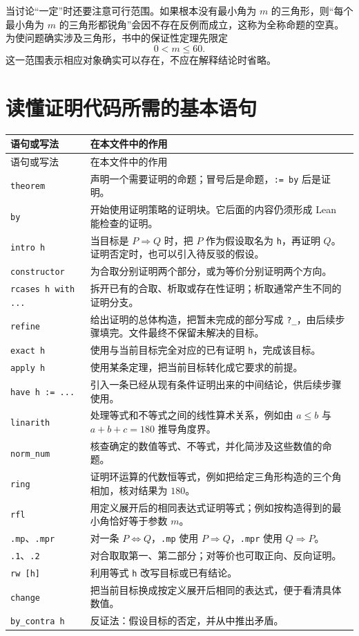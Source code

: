 \documentclass[UTF8,a4paper,zihao=-4,oneside,openany,fontset=fandol]{ctexbook}
\theoremstyle{definition}
\theoremstyle{remark}
\begin{document}
当讨论“一定”时还要注意可行范围。如果根本没有最小角为 $m$ 的三角形，则“每个最小角为 $m$ 的三角形都锐角”会因不存在反例而成立，这称为全称命题的空真。为使问题确实涉及三角形，书中的保证性定理先限定
\[
0<m\le60.
\]
这一范围表示相应对象确实可以存在，不应在解释结论时省略。

\clearpage
\section{读懂证明代码所需的基本语句}

\begin{longtable}{@{}p{}p{}@{}}
\toprule
语句或写法 & 在本文件中的作用\\
\midrule
\endfirsthead
\toprule
语句或写法 & 在本文件中的作用\\
\midrule
\endhead
\texttt{theorem} & 声明一个需要证明的命题；冒号后是命题，\texttt{:= by} 后是证明。\\
\texttt{by} & 开始使用证明策略的证明块。它后面的内容仍须形成 Lean 能检查的证明。\\
\texttt{intro h} & 当目标是 $P\Rightarrow Q$ 时，把 $P$ 作为假设取名为 \texttt{h}，再证明 $Q$。证明否定时，也可以引入待反驳的假设。\\
\texttt{constructor} & 为合取分别证明两个部分，或为等价分别证明两个方向。\\
\texttt{rcases h with ...} & 拆开已有的合取、析取或存在性证明；析取通常产生不同的证明分支。\\
\texttt{refine} & 给出证明的总体构造，把暂未完成的部分写成 \texttt{?\_}，由后续步骤填完。文件最终不保留未解决的目标。\\
\texttt{exact h} & 使用与当前目标完全对应的已有证明 \texttt{h}，完成该目标。\\
\texttt{apply h} & 使用某条定理，把当前目标转化成它要求的前提。\\
\texttt{have h := ...} & 引入一条已经从现有条件证明出来的中间结论，供后续步骤使用。\\
\texttt{linarith} & 处理等式和不等式之间的线性算术关系，例如由 $a\le b$ 与 $a+b+c=180$ 推导角度界。\\
\texttt{norm\_num} & 核查确定的数值等式、不等式，并化简涉及这些数值的命题。\\
\texttt{ring} & 证明环运算的代数恒等式，例如把给定三角形构造的三个角相加，核对结果为 $180$。\\
\texttt{rfl} & 用定义展开后的相同表达式证明等式；例如按构造得到的最小角恰好等于参数 $m$。\\
\texttt{.mp}、\texttt{.mpr} & 对一条 $P\Leftrightarrow Q$，\texttt{.mp} 使用 $P\Rightarrow Q$，\texttt{.mpr} 使用 $Q\Rightarrow P$。\\
\texttt{.1}、\texttt{.2} & 对合取取第一、第二部分；对等价也可取正向、反向证明。\\
\texttt{rw [h]} & 利用等式 \texttt{h} 改写目标或已有结论。\\
\texttt{change} & 把当前目标换成按定义展开后相同的表达式，便于看清具体数值。\\
\texttt{by\_contra h} & 反证法：假设目标的否定，并从中推出矛盾。\\
\bottomrule
\end{longtable}
\end{document}
